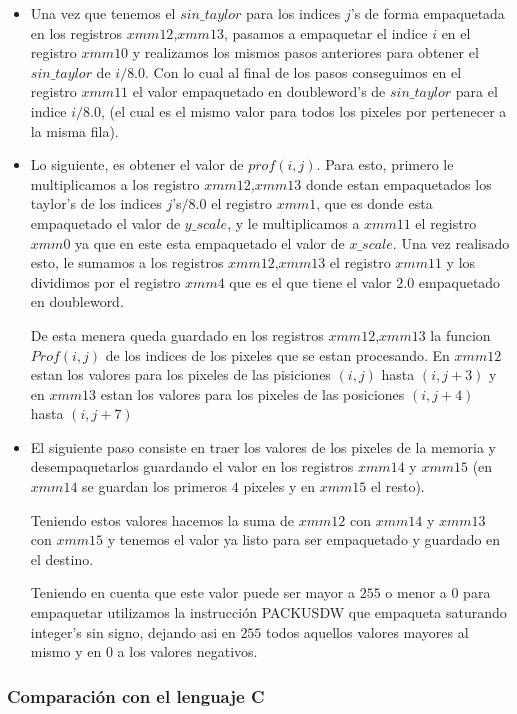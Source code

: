 \begin{itemize}
	\item Una vez que tenemos el $sin\_taylor$ para los indices $j$'s de forma empaquetada en los registros $xmm12$,$xmm13$, pasamos a empaquetar el indice $i$ en el registro $xmm10$ y realizamos los mismos pasos anteriores para obtener el $sin\_taylor$ de $i/8.0$. Con lo cual al final de los pasos conseguimos en el registro $xmm11$ el valor empaquetado en doubleword's de $sin\_taylor$ para el indice $i/8.0$, (el cual es el mismo valor para todos los pixeles por pertenecer a la misma fila).

	\item Lo siguiente, es obtener el valor de $prof(i,j)$. Para esto, primero le multiplicamos a los registro $xmm12$,$xmm13$ donde estan empaquetados los taylor's de los indices $j$'s$/8.0$ el registro $xmm1$, que es donde esta empaquetado el valor de $y\_scale$, y le multiplicamos  a $xmm11$ el registro $xmm0$ ya que en este esta empaquetado el valor de $x\_scale$. Una vez realisado esto, le sumamos a los registros $xmm12$,$xmm13$ el registro $xmm11$ y los dividimos por el registro $xmm4$ que es el que tiene el valor $2.0$ empaquetado en doubleword.

	De esta menera queda guardado en los registros $xmm12$,$xmm13$ la funcion $Prof(i,j)$ de los indices de los pixeles que se estan procesando. En $xmm12$ estan los valores para los pixeles de las pisiciones $(i,j)$ hasta $(i,j+3)$ y en $xmm13$ estan los valores para los pixeles de las posiciones $(i,j+4)$ hasta $(i,j+7)$

	\item El siguiente paso consiste en traer los valores de los pixeles de la memoria y desempaquetarlos guardando el valor en los registros $xmm14$ y $xmm15$ (en $xmm14$ se guardan los primeros $4$ pixeles y en $xmm15$ el resto).

	Teniendo estos valores hacemos la suma de $xmm12$ con $xmm14$ y $xmm13$ con $xmm15$ y tenemos el valor ya listo para ser empaquetado y guardado en el destino.

	Teniendo en cuenta que este valor puede ser mayor a $255$ o menor a $0$ para empaquetar utilizamos la instrucción PACKUSDW que empaqueta saturando integer's sin signo, dejando asi en $255$ todos aquellos valores mayores al mismo y en $0$ a los valores negativos.

\end{itemize}

\subsubsection{Comparación con el lenguaje C}

